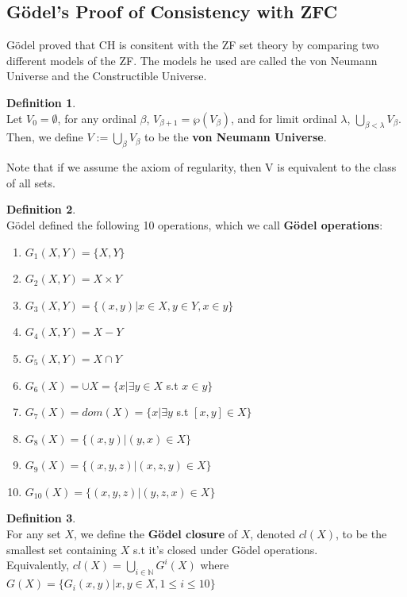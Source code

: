 \documentclass[12pt]{article}
\theoremstyle{definition}
\newtheorem{definition}{Definition}[section]
\begin{document}
\subsection{Gödel's Proof of Consistency with ZFC}
Gödel proved that CH is consitent with the ZF set theory by comparing two different models of the ZF. The models he used are called the von Neumann Universe and the Constructible Universe. 
\begin{definition}
    \\Let $V_0=\emptyset$, for any ordinal $\beta$, $V_{\beta+1}=\wp(V_\beta)$, and for limit ordinal $\lambda$, $\bigcup\limits_{\beta<\lambda} V_\beta$. Then, we define $V:=\bigcup\limits_{\beta} V_\beta$ to be the \textbf{von Neumann Universe}. 
\end{definition}
Note that if we assume the axiom of regularity, then V is equivalent to the class of all sets.
\begin{definition}
    \\Gödel defined the following 10 operations, which we call \textbf{Gödel operations}: 
    \begin{enumerate}
        \item $G_1(X,Y)=\{X,Y\}$
        \item $G_2(X,Y)= X\times Y$
        \item $G_3(X,Y)=\{(x,y)|x\in X,y\in Y,x\in y\}$
        \item $G_4(X,Y)=X-Y$
        \item $G_5(X,Y)=X\cap Y$
        \item $G_6(X)=\cup X=\{x|\exists y\in X$ s.t $x\in y\}$
        \item $G_7(X)=dom(X)=\{x|\exists y $ s.t $[x,y]\in X\}$
        \item $G_8(X)=\{(x,y)|(y,x)\in X\}$
        \item $G_9(X)=\{(x,y,z) | (x,z,y)\in X\}$
        \item $G_{10}(X)=\{(x,y,z)|(y,z,x)\in X\}$
    \end{enumerate}
\end{definition}
\begin{definition}
    \\For any set $X$, we define the \textbf{Gödel closure} of $X$, denoted $cl(X)$, to be the smallest set containing $X$ s.t it's closed under Gödel operations. \\Equivalently, $cl(X)=\bigcup\limits_{i\in \mathbb{N}} G^i(X)$ where $G(X)=\{G_i(x,y)|x,y\in X, 1\leq i \leq 10\}$
\end{definition}
\end{document}

